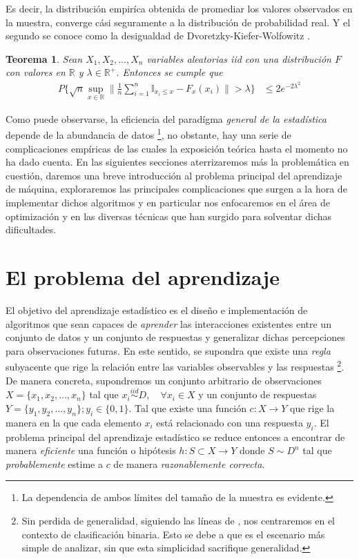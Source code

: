 \documentclass{book}
\theoremstyle{plain}
\newtheorem{thm}{Teorema}[section]
\theoremstyle{definition}
\theoremstyle{remark}
\begin{document}
Es decir, la distribución empiríca obtenida de promediar los valores observados en la muestra, converge cási seguramente a la distribución de probabilidad real. Y el segundo se conoce como la desigualdad de Dvoretzky-Kiefer-Wolfowitz \cite{MASSART}.

\bigskip

\begin{thm}
Sean $X_1,X_2,\dots,X_n$ variables aleatorias iid con una distribución $F$ con valores en $\mathbb{R}$ y $\lambda\in\mathbb{R}^+$. Entonces se cumple que
\begin{equation*}
\begin{split}
P\bigg\{\sqrt{n}\displaystyle\sup_{x\in\mathbb{R}}\bigg\|\frac{1}{n}\displaystyle\sum_{i=1}^n\mathbb{I}_{x_i\leq x}-F_{x}(x_i)\bigg\| > \lambda \bigg\}& \leq 2e^{-2\lambda^2}
\end{split}
\end{equation*}
\end{thm}

Como puede observarse, la eficiencia del paradígma \emph{general de la estadística} depende de la abundancia de datos \footnote{La dependencia de ambos límites del tamaño de la muestra es evidente.}, no obstante, hay una serie de complicaciones empíricas de las cuales la exposición teórica hasta el momento no ha dado cuenta. En las siguientes secciones aterrizaremos más la problemática en cuestión, daremos una breve introducción al problema principal del aprendizaje de máquina, exploraremos las principales complicaciones que surgen a la hora de implementar dichos algoritmos y en particular nos enfocaremos en el área de optimización y en las diversas técnicas que han surgido para solventar dichas dificultades.

\section{El problema del aprendizaje}

El objetivo del aprendizaje estadístico es el diseño e implementación de algoritmos que sean capaces de \emph{aprender} las interacciones existentes entre un conjunto de datos y un conjunto de respuestas y generalizar dichas percepciones para observaciones futuras. En este sentido, se supondra que existe una \emph{regla} subyacente que rige la relación entre las variables observables y las respuestas \footnote{Sin perdida de generalidad, siguiendo las líneas de \cite{VAPNIK1}, nos centraremos en el contexto de clasificación binaria. Esto se debe a que es el escenario más simple de analizar, sin que esta simplicidad sacrifique generalidad.}. De manera concreta, supondremos un conjunto arbitrario de observaciones $X=\{x_1,x_2,\dots,x_n\}$ tal que $x_i \stackrel{iid}{\sim} D,\quad\forall x_i\in X$ y un conjunto de respuestas $Y=\{y_1, y_2, \dots,y_n\};y_i\in \{0,1\}$. Tal que existe una función $c:X\rightarrow Y$ que rige la manera en la que cada elemento $x_i$ está relacionado con una respuesta $y_i$. El problema principal del aprendizaje estadístico se reduce entonces a encontrar de manera \emph{eficiente} una función o hipótesis $h:S\subset X\rightarrow Y$ donde $S\sim D^n$ tal que \emph{probablemente} estime a $c$ de manera \emph{razonablemente correcta}.
\end{document}
